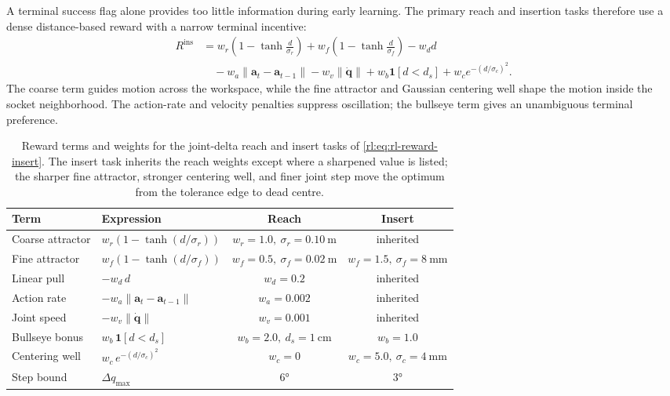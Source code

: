 A terminal success flag alone provides too little information during early learning. The primary reach and insertion tasks therefore use a dense distance-based reward with a narrow terminal incentive:
\begin{equation}
\begin{aligned}
R^{\text{ins}} &= w_r\!\left(1-\tanh\frac{d}{\sigma_r}\right)+w_f\!\left(1-\tanh\frac{d}{\sigma_f}\right)-w_d d \\
&\quad-w_a\lVert\bm a_t-\bm a_{t-1}\rVert-w_v\lVert\dot{\bm q}\rVert
+w_b\mathbf1[d<d_s]+w_c e^{-(d/\sigma_c)^2}.
\end{aligned}
\label{rl:eq:rl-reward-insert}
\end{equation}
The coarse term guides motion across the workspace, while the fine attractor and Gaussian centering well shape the motion inside the socket neighborhood. The action-rate and velocity penalties suppress oscillation; the bullseye term gives an unambiguous terminal preference.

\begin{table}[!ht]
\centering
\caption{Reward terms and weights for the joint-delta reach and insert tasks of
\eqref{rl:eq:rl-reward-insert}. The insert task inherits the reach weights except where a sharpened
value is listed; the sharper fine attractor, stronger centering well, and finer joint step move the
optimum from the tolerance edge to dead centre.}
\label{rl:tab:rl-reward}
\begin{tabular}{@{}llcc@{}}
\toprule
Term & Expression & Reach & Insert \\
\midrule
Coarse attractor   & $w_r(1-\tanh(d/\sigma_r))$ & $w_r{=}1.0,\ \sigma_r{=}\SI{0.10}{\meter}$ & inherited \\
Fine attractor     & $w_f(1-\tanh(d/\sigma_f))$ & $w_f{=}0.5,\ \sigma_f{=}\SI{0.02}{\meter}$ & $w_f{=}1.5,\ \sigma_f{=}\SI{8}{\milli\meter}$ \\
Linear pull        & $-w_d\,d$ & $w_d{=}0.2$ & inherited \\
Action rate        & $-w_a\lVert\bm a_t-\bm a_{t-1}\rVert$ & $w_a{=}0.002$ & inherited \\
Joint speed        & $-w_v\lVert\dot{\bm q}\rVert$ & $w_v{=}0.001$ & inherited \\
Bullseye bonus     & $w_b\,\mathbf 1[d<d_s]$ & $w_b{=}2.0,\ d_s{=}\SI{1}{\centi\meter}$ & $w_b{=}1.0$ \\
Centering well     & $w_c\,e^{-(d/\sigma_c)^2}$ & $w_c{=}0$ & $w_c{=}5.0,\ \sigma_c{=}\SI{4}{\milli\meter}$ \\
Step bound         & $\Delta q_{\max}$ & $\ang{6}$ & $\ang{3}$ \\
\bottomrule
\end{tabular}
\end{table}

